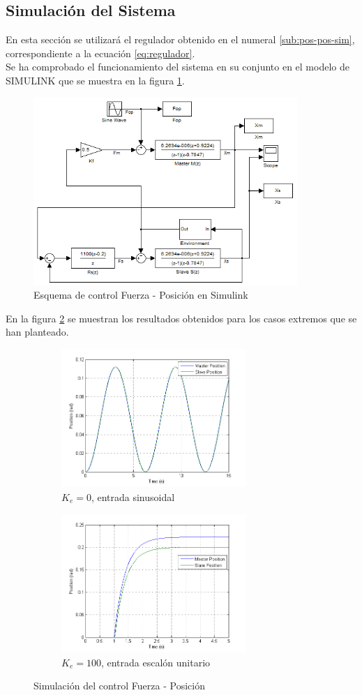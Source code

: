 \subsection{Simulación del Sistema}
\label{sub:force-pos-sim}
En esta sección se utilizará el regulador obtenido en el numeral \ref{sub:pos-pos-sim}, correspondiente a la ecuación \eqref{eq:regulador}.
\\
Se ha comprobado el funcionamiento del sistema en su conjunto en el modelo de SIMULINK que se muestra en la figura \ref{fig:force-pos-esq}.
\begin{figure}[htbp]
\centering
	\includegraphics[width=10cm]{force-pos-esq}
	\caption{Esquema de control Fuerza - Posición en Simulink}
  	\label{fig:force-pos-esq}
\end{figure}
En la figura \ref{fig:force-pos-sim} se muestran los resultados obtenidos para los casos extremos que se han planteado.
\begin{figure}[htbp]
\centering
	\begin{subfigure}[h]
		\centering
		\includegraphics[height=5.25cm]{force-pos-libre}
		\caption{$K_e = 0$, entrada sinusoidal}
	\end{subfigure}
	\begin{subfigure}[h]
		\centering
		\includegraphics[height=5.25cm]{force-pos-env}
		\caption{$K_e = 100$, entrada escalón unitario}
	\end{subfigure}
	\caption{Simulación del control Fuerza - Posición}
  	\label{fig:force-pos-sim}
\end{figure}

